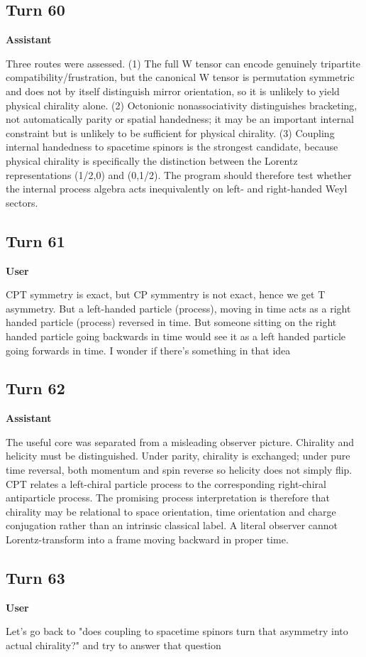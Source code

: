 \documentclass[11pt,a4paper]{article}
\newcommand{\speaker}[1]{\par\medskip\noindent\textbf{\large #1}\par\smallskip}
\begin{document}
\subsection*{Turn 60}
\speaker{Assistant}
Three routes were assessed. (1) The full W tensor can encode genuinely tripartite compatibility/frustration, but the canonical W tensor is permutation symmetric and does not by itself distinguish mirror orientation, so it is unlikely to yield physical chirality alone. (2) Octonionic nonassociativity distinguishes bracketing, not automatically parity or spatial handedness; it may be an important internal constraint but is unlikely to be sufficient for physical chirality. (3) Coupling internal handedness to spacetime spinors is the strongest candidate, because physical chirality is specifically the distinction between the Lorentz representations (1/2,0) and (0,1/2). The program should therefore test whether the internal process algebra acts inequivalently on left- and right-handed Weyl sectors.
\subsection*{Turn 61}
\speaker{User}
CPT symmetry is exact, but CP symmentry is not exact, hence we get T asymmetry. But a left-handed particle (process), moving in time acts as a right handed particle (process) reversed in time. But someone sitting on the right handed particle going backwards in time would see it as a left handed particle going forwards in time. I wonder if there's something in that idea
\subsection*{Turn 62}
\speaker{Assistant}
The useful core was separated from a misleading observer picture. Chirality and helicity must be distinguished. Under parity, chirality is exchanged; under pure time reversal, both momentum and spin reverse so helicity does not simply flip. CPT relates a left-chiral particle process to the corresponding right-chiral antiparticle process. The promising process interpretation is therefore that chirality may be relational to space orientation, time orientation and charge conjugation rather than an intrinsic classical label. A literal observer cannot Lorentz-transform into a frame moving backward in proper time.
\subsection*{Turn 63}
\speaker{User}
Let's go back to "does coupling to spacetime spinors turn that asymmetry into actual chirality?" and try to answer that question
\end{document}
